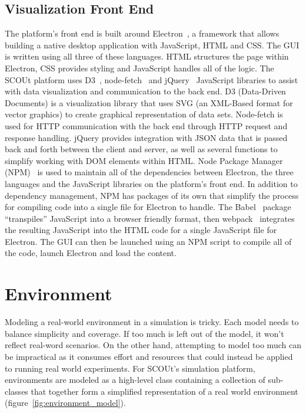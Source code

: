\subsection{Visualization Front End} \label{subsec:front_end}
The platform's front end is built around Electron~\cite{electron}, a framework that allows building a native desktop application with JavaScript, HTML and CSS.
The GUI is written using all three of these languages.
HTML structures the page within Electron, CSS provides styling and JavaScript handles all of the logic.
The SCOUt platform uses D3~\cite{d3}, node-fetch~\cite{node-fetch} and jQuery~\cite{jquery} JavaScript libraries to assist with data visualization and communication to the back end.
D3 (Data-Driven Documents) is a visualization library that uses SVG (an XML-Based format for vector graphics) to create graphical representation of data sets.
Node-fetch is used for HTTP communication with the back end through HTTP request and response handling.
jQuery provides integration with JSON data that is passed back and forth between the client and server, as well as several functions to simplify working with DOM elements within HTML.
Node Package Manager (NPM)~\cite{npm} is used to maintain all of the dependencies between Electron, the three languages and the JavaScript libraries on the platform's front end.
In addition to dependency management, NPM has packages of its own that simplify the process for compiling code into a single file for Electron to handle.
The Babel~\cite{babel} package ``transpiles'' JavaScript into a browser friendly format, then webpack~\cite{webpack} integrates the resulting JavaScript into the HTML code for a single JavaScript file for Electron.
The GUI can then be launched using an NPM script to compile all of the code, launch Electron and load the content.



\section{Environment} \label{sec:environment}
Modeling a real-world environment in a simulation is tricky.
Each model needs to balance simplicity and coverage.
If too much is left out of the model, it won’t reflect real-word scenarios.
On the other hand, attempting to model too much can be impractical as it consumes effort and resources that could instead be applied to running real world experiments.
For SCOUt's simulation platform, environments are modeled as a high-level class containing a collection of sub-classes that together form a simplified representation of a real world environment (figure~\ref{fig:environment_model}).

